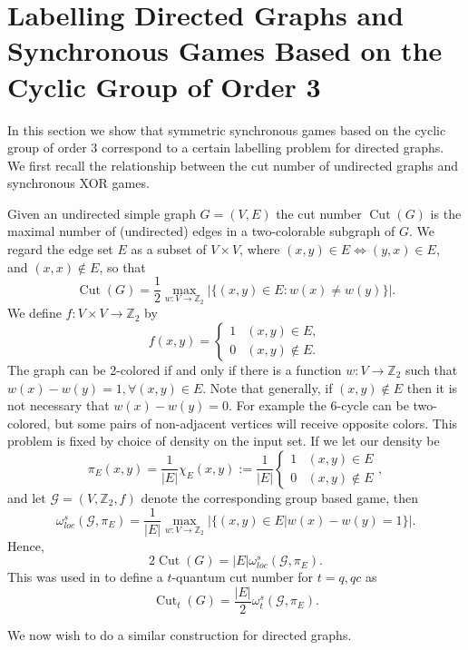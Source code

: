 \documentclass[11pt]{amsart}
\theoremstyle{definition}
\DeclareMathOperator{\Cut}{Cut}
\newcommand{\bb}[1]{\mathbb{#1}}
\newcommand{\cl}[1]{\mathcal{#1}}
\begin{document}
  \section{Labelling Directed Graphs and Synchronous Games Based on the Cyclic Group of Order 3}

In this section we show that symmetric synchronous games based on the cyclic group of order 3 correspond to a certain labelling problem for directed graphs.  We first recall the relationship between the cut number of undirected graphs and synchronous XOR games.

  Given an undirected simple graph $G=(V,E)$ the cut number $\Cut(G)$ is the maximal number of (undirected) edges in a two-colorable subgraph of $G$.
  We regard the edge set $E$ as a subset of $V\times V$, where $(x,y)\in E\iff (y,x)\in E$, and $(x,x) \notin E$, so that
  \[\Cut(G)=\frac12\max_{w:V\to \bb Z_2}\big|\{(x,y)\in E: w(x)\ne w(y)\}\big|.\]
  We define $f:V \times V \to \bb Z_2$ by
  \[ f(x,y) = \begin{cases} 1 & (x,y) \in E, \\ 0 & (x,y) \notin E. \end{cases}\]
  The graph can be 2-colored if and only if there is a function $w:V \to \bb Z_2$ such that $w(x) - w(y) = 1, \forall (x,y) \in E$.
  Note that generally, if $(x,y) \notin E$ then it is not necessary that $w(x) - w(y) =0$. For example the 6-cycle can be two-colored, but some pairs of non-adjacent vertices will receive opposite colors. This problem is fixed by choice of density on the input set.  If we let our density be
  \[ \pi_E(x,y) = \frac{1}{|E|} \chi_E(x,y) := \frac{1}{|E|} \begin{cases} 1 & (x,y) \in E \\ 0 & (x,y) \notin E \end{cases},\]
  and let $\cl G=(V,\bb Z_2,f)$ denote the corresponding group based game, then
  \[\omega^s_{loc} ( \cl G,\pi_E) = \frac{1}{|E|} \max_{w:V \to \bb Z_2} \big|\{(x,y)\in E |w(x)-w(y)=1\}\big|.\]
  Hence,
  \[ 2 \Cut(G) = |E|\omega^s_{loc}(\cl G,\pi_E).\]
  This was used in \cite{HMNPR} to define a $t$-quantum cut number for $t=q,qc$ as
 \[  \Cut_t(G) = \frac{|E|}2 \omega^s_t(\cl G,\pi_E).\]

  We now wish to do a similar construction for directed graphs.
\end{document}
